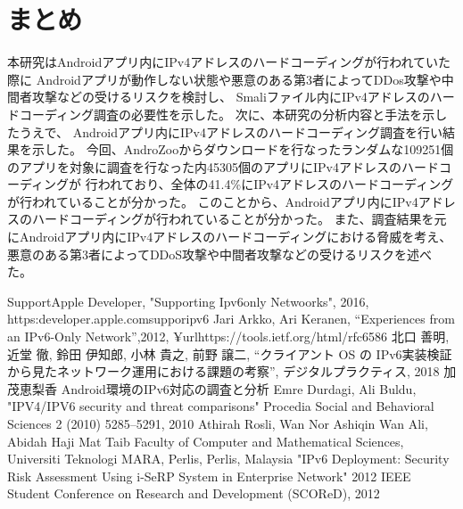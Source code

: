 \documentclass[a4j]{jarticle}
\begin{document}
\section{まとめ}
本研究はAndroidアプリ内にIPv4アドレスのハードコーディングが行われていた際に
Androidアプリが動作しない状態や悪意のある第3者によってDDos攻撃や中間者攻撃などの受けるリスクを検討し、
Smaliファイル内にIPv4アドレスのハードコーディング調査の必要性を示した。
次に、本研究の分析内容と手法を示したうえで、
Androidアプリ内にIPv4アドレスのハードコーディング調査を行い結果を示した。
今回、AndroZooからダウンロードを行なったランダムな109251個のアプリを対象に調査を行なった内45305個のアプリにIPv4アドレスのハードコーディングが
行われており、全体の41.4\%にIPv4アドレスのハードコーディングが行われていることが分かった。
このことから、Androidアプリ内にIPv4アドレスのハードコーディングが行われていることが分かった。
また、調査結果を元にAndroidアプリ内にIPv4アドレスのハードコーディングにおける脅威を考え、
悪意のある第3者によってDDoS攻撃や中間者攻撃などの受けるリスクを述べた。

\newpage
\begin{thebibliography}{99}
	
	Support\-Apple Developer, "Supporting Ipv6\-only Netwoorks", 2016, https:\/\/developer.apple.com\/suppor\/ipv6
	Jari Arkko, Ari Keranen,  ``Experiences from an IPv6-Only Network'',2012, ¥url{https://tools.ietf.org/html/rfc6586}
	北口 善明, 近堂 徹, 鈴田 伊知郎, 小林 貴之, 前野 譲二, “クライアント OS の IPv6実装検証から見たネットワーク運用における課題の考察”, デジタルプラクティス, 2018
	加茂恵梨香 Android環境のIPv6対応の調査と分析
	Emre Durdagi, Ali Buldu, "IPV4/IPV6 security and threat comparisons" Procedia Social and Behavioral Sciences 2 (2010) 5285–5291, 2010
	Athirah Rosli, Wan Nor Ashiqin Wan Ali, Abidah Haji Mat Taib  Faculty of Computer and Mathematical Sciences, Universiti Teknologi MARA, Perlis, Perlis, Malaysia  "IPv6 Deployment: Security Risk Assessment Using i-SeRP System in Enterprise Network" 2012 IEEE Student Conference on Research and Development (SCOReD), 2012
\end{thebibliography}
\end{document}
